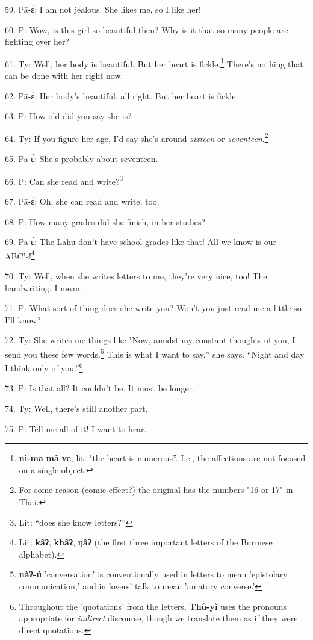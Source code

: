 59. Pā-ɛ́: I am not jealous. She likes me, so I like her!

60. P: Wow, is this girl so beautiful then? Why is it that so many people
are fighting over her?

61. Ty: Well, her body is beautiful. But her heart is fickle.\footnote{\textbf{ni-ma} \textbf{mâ} \textbf{ve}, lit: "the heart is numerous''. I.e., the affections are not focused on a single object.} There's
nothing that can be done with her right now.

62. Pā-ɛ́: Her body's beautiful, all right. But her heart is fickle.

63. P: How old did you say she is?

64. Ty: If you figure her age, I'd say she's around \textit{sixteen} or \textit{seventeen}.\footnote{For some reason (comic effect?) the original has the numbers "16 or 17" in Thai.}

65. Pā-ɛ́: She's probably about seventeen.

66. P: Can she read and write?\footnote{Lit: ``does she know letters?''}

67. Pā-ɛ́: Oh, she can read and write, too.

68. P: How many grades did she finish, in her studies?

69. Pā-ɛ́: The Lahu don't have school-grades like that! All we know is our ABC's!\footnote{Lit: \textbf{kâʔ}, \textbf{khâʔ}, \textbf{ŋâʔ} (the first three important letters of the Burmese alphabet).}

70. Ty: Well, when she writes letters to me, they're very nice, too! The handwriting,
I mean.

71. P: What sort of thing does she write you? Won't you just read me a little
so I'll know?

72. Ty: She writes me things like "Now, amidst my constant thoughts
of you, I send you these few words.\footnote{\textbf{nàʔ-ú} 'conversation' is conventionally used in letters to mean 'epistolary communication,' and in lovers' talk to mean 'amatory converse.'} This is what I want to say,'' she says.
``Night and day I think only of you.''\footnote{Throughout the 'quotations' from the letters, \textbf{Thû-yì} uses the pronouns appropriate for\textit{ indirect }discourse, though we translate them as if they were direct quotations.}

73. P: Is that all? It couldn't be. It must be longer.

74. Ty: Well, there's still another part.

75. P: Tell me all of it! I want to hear.

